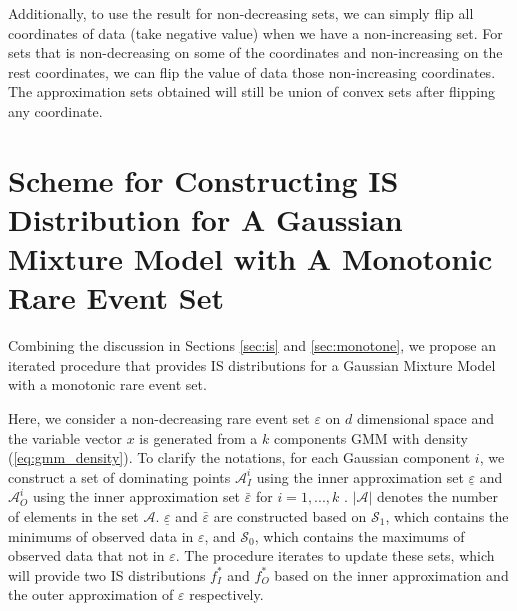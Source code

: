 \documentclass[conference]{IEEEtran}
\begin{document}
Additionally, to use the result for non-decreasing sets, we can simply flip all coordinates of data (take negative value) when we have a non-increasing set. For sets that is non-decreasing on some of the coordinates and non-increasing on the rest coordinates, we can flip the value of data those non-increasing coordinates. The approximation sets obtained will still be union of convex sets after flipping any coordinate.

\section{Scheme for Constructing IS Distribution for A Gaussian Mixture Model with A Monotonic Rare Event Set}

Combining the discussion in Sections \ref{sec:is} and \ref{sec:monotone}, we propose an iterated procedure that provides IS distributions for a Gaussian Mixture Model with a monotonic rare event set.

Here, we consider a non-decreasing rare event set $\varepsilon$ on $d$ dimensional space and the variable vector $x$ is generated from a $k$ components GMM with density (\ref{eq:gmm_density}). To clarify the notations, for each Gaussian component $i$, we construct a set of dominating points $\mathcal{A}_I^i$ using the inner approximation set $\underline{\varepsilon}$ and $\mathcal{A}_O^i$ using the inner approximation set $\bar{\varepsilon}$ for $i=1,...,k$ . $|\mathcal{A}|$ denotes the number of elements in the set $\mathcal{A}$. $\underline{\varepsilon}$ and $\bar{\varepsilon}$ are constructed based on $\mathcal{S}_1$, which contains the minimums of observed data in $\varepsilon$, and $\mathcal{S}_0$, which contains the maximums of observed data that not in $\varepsilon$. The procedure iterates to update these sets, which will provide two IS distributions $f^*_I$ and $f^*_O$ based on the inner approximation and the outer approximation of $\varepsilon$ respectively.
\end{document}
